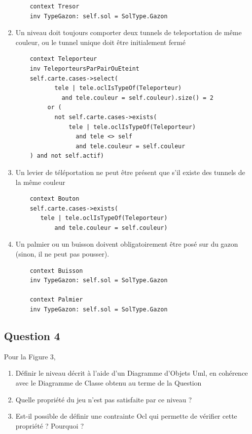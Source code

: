 \documentclass[11pt]{article}
\begin{document}
\begin{enumerate}
  \begin{verbatim}
    context Tresor
    inv TypeGazon: self.sol = SolType.Gazon
  \end{verbatim}     
  
  \item  Un niveau doit toujours comporter deux tunnels de teleportation de même couleur, ou le tunnel unique doit être initialement fermé 
  
  \begin{verbatim}
    context Teleporteur
    inv TeleporteursParPairOuEteint
    self.carte.cases->select(
           tele | tele.oclIsTypeOf(Teleporteur)
             and tele.couleur = self.couleur).size() = 2
         or (
           not self.carte.cases->exists(
               tele | tele.oclIsTypeOf(Teleporteur)
                 and tele <> self
                 and tele.couleur = self.couleur
    ) and not self.actif)
  \end{verbatim}     
  
  \item Un levier de téléportation ne peut être présent que s'il existe des tunnels de la même couleur
  
  \begin{verbatim}
    context Bouton
    self.carte.cases->exists(
       tele | tele.oclIsTypeOf(Teleporteur)
           and tele.couleur = self.couleur)
  \end{verbatim}     
  
  \item Un palmier ou un buisson doivent obligatoirement être posé sur du gazon (sinon, il ne peut pas pousser).
  
  \begin{verbatim}
    context Buisson
    inv TypeGazon: self.sol = SolType.Gazon
    
    context Palmier
    inv TypeGazon: self.sol = SolType.Gazon
  \end{verbatim}     
  
\end{enumerate}

\subsection{Question 4}
Pour la Figure 3,

\begin{enumerate}
  \item Définir le niveau décrit à l'aide d'un Diagramme d'Objets Uml, en cohérence avec le Diagramme de Classe obtenu au terme de la Question   
  
  \item Quelle propriété du jeu n'est pas satisfaite par ce niveau ?
  
  \item Est-il possible de définir une contrainte Ocl qui permette de vérifier cette propriété ? Pourquoi ?
  
\end{enumerate}
 
\end{document}
